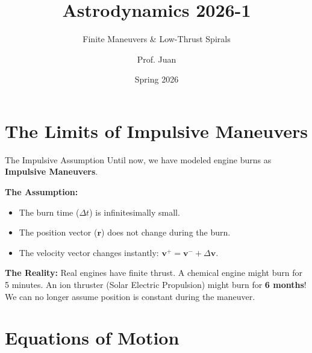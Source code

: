 \documentclass[11pt]{beamer}
\title[Continuous-Thrust Trajectories]{Astrodynamics 2026-1}
\subtitle{Finite Maneuvers \& Low-Thrust Spirals}
\author{Prof. Juan}
\institute{Universidad de Antioquia - Aerospace Engineering}
\date{Spring 2026}
\begin{document}
\begin{frame}
    \titlepage
\end{frame}

\section{The Limits of Impulsive Maneuvers}

\begin{frame}{The Impulsive Assumption}
    Until now, we have modeled engine burns as \textbf{Impulsive Maneuvers}. 
    
    \vspace{0.3cm}
    \textbf{The Assumption:} 
    \begin{itemize}
        \item The burn time ($\Delta t$) is infinitesimally small.
        \item The position vector ($\boldsymbol{r}$) does not change during the burn.
        \item The velocity vector changes instantly: $\boldsymbol{v}^+ = \boldsymbol{v}^- + \Delta\boldsymbol{v}$.
    \end{itemize}
    
    \vspace{0.3cm}
    \textbf{The Reality:}
    Real engines have finite thrust. A chemical engine might burn for 5 minutes. An ion thruster (Solar Electric Propulsion) might burn for \textbf{6 months}! We can no longer assume position is constant during the maneuver.
\end{frame}

\section{Equations of Motion}
\end{document}
